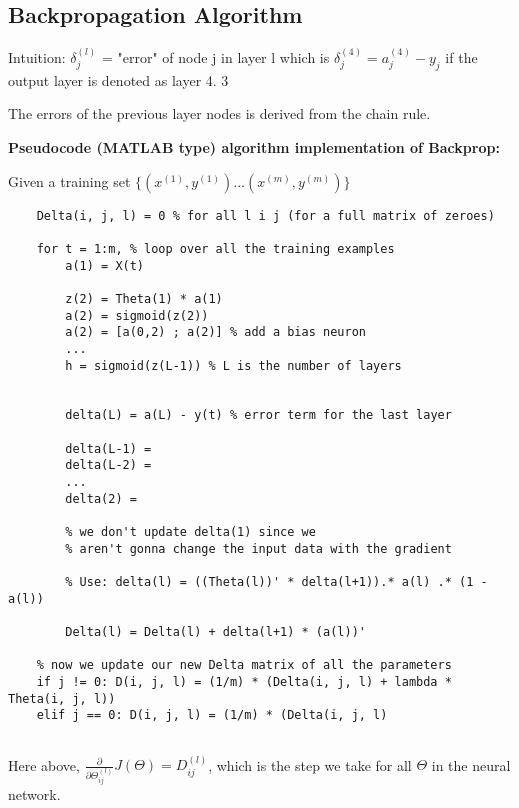 \documentclass{article}
\begin{document}
\subsection{Backpropagation Algorithm}

Intuition: $\delta_j^{(l)}$ = "error" of node j in layer l which is $\delta_j^{({4})} = a_j^{(4)} - y_j$ if the output layer is denoted as layer 4. 3

The errors of the previous layer nodes is derived from the chain rule.

\begin{myboxb}
    
    
\textbf{Pseudocode (MATLAB type) algorithm implementation of Backprop:} 

Given a training set $\{ (x^{(1)}, y^{(1)}) ... (x^{(m)}, y^{(m)}) \}$

\begin{verbatim}
    Delta(i, j, l) = 0 % for all l i j (for a full matrix of zeroes)
    
    for t = 1:m, % loop over all the training examples
        a(1) = X(t)
        
        z(2) = Theta(1) * a(1)
        a(2) = sigmoid(z(2))
        a(2) = [a(0,2) ; a(2)] % add a bias neuron
        ...
        h = sigmoid(z(L-1)) % L is the number of layers
        
        
        delta(L) = a(L) - y(t) % error term for the last layer
        
        delta(L-1) = 
        delta(L-2) = 
        ...
        delta(2) = 
        
        % we don't update delta(1) since we 
        % aren't gonna change the input data with the gradient 
        
        % Use: delta(l) = ((Theta(l))' * delta(l+1)).* a(l) .* (1 - a(l))
        
        Delta(l) = Delta(l) + delta(l+1) * (a(l))'
        
    % now we update our new Delta matrix of all the parameters
    if j != 0: D(i, j, l) = (1/m) * (Delta(i, j, l) + lambda * Theta(i, j, l)) 
    elif j == 0: D(i, j, l) = (1/m) * (Delta(i, j, l) 
    
\end{verbatim}
\end{myboxb}


Here above, $ \frac{\partial}{\partial \Theta_{ij}^{(l)}} J(\Theta) = D_{ij}^{(l)} $, which is the step we take for all $\Theta$ in the neural network.
\end{document}
